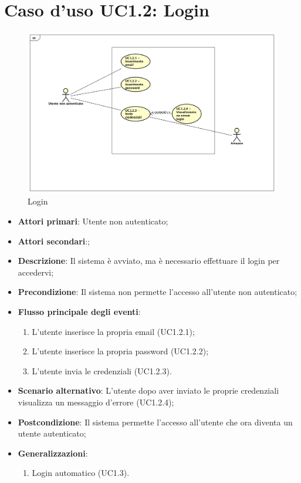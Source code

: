 \section{Caso d'uso UC1.2: Login}
\begin{figure} [h]
	\centering
	\includegraphics[scale=0.4]{./Diagram/UC1-2.png}
	\caption{Login}\label{}
\end{figure}
\begin{itemize}
	\item \textbf{Attori primari}: Utente non autenticato;
	\item \textbf{Attori secondari}:;
	\item \textbf{Descrizione}: Il sistema è avviato, ma è necessario effettuare il login per accedervi;
	\item \textbf{Precondizione}: Il sistema non permette l'accesso all'utente non autenticato;
	\item \textbf{Flusso principale degli eventi}:
	\begin{enumerate}
		\item L'utente inserisce la propria email (UC1.2.1);
		\item L'utente inserisce la propria password (UC1.2.2);
		\item L'utente invia le credenziali (UC1.2.3).
	\end{enumerate}
	\item \textbf{Scenario alternativo}: L'utente dopo aver inviato le proprie credenziali visualizza un messaggio d'errore (UC1.2.4);
	\item \textbf{Postcondizione}: Il sistema permette l'accesso all'utente che ora diventa un utente autenticato; 
	\item \textbf{Generalizzazioni}:
	\begin{enumerate}
		\item Login automatico (UC1.3).
	\end{enumerate}
\end{itemize}


